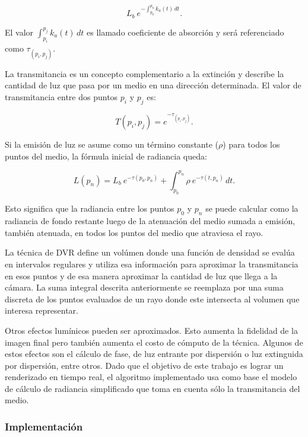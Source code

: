 \documentclass[oneside,a4paper,spanish,links]{amca}
\begin{document}
\begin{equation} \label{eq:radiance_absorption}  
    L_b \ \displaystyle e^{-\int_{p_0}^{p_n} k_a(t) \, dt}.
\end{equation}

El valor $\int_{p_i}^{p_j} k_a(t) \, dt$ es llamado coeficiente de
absorción y será referenciado como $\tau_{(p_i, p_j)}$.

La transmitancia es un concepto complementario a la extinción y
describe la cantidad de luz que pasa por un medio en una dirección
determinada. El valor de transmitancia entre dos puntos $p_i$ y $p_j$
es:

\begin{equation} \label{eq:general_radiance}  
  T(p_i,p_j) = e^{-\tau_{(p_i, p_j)}}.
\end{equation}

Si la emisión de luz se asume como un término constante ($\rho$) para
todos los puntos del medio, la fórmula inicial de radiancia queda:

\begin{equation} \label{eq:ray_radiance}  
  L(p_n) = L_b \ e^{-\tau(p_0, p_n)} + \int_{p_0}^{p_n} \rho \ e^{-\tau(t,p_n)} \, dt.
\end{equation}

Esto significa que la radiancia entre los puntos $p_0$ y
$p_n$ se puede calcular como la radiancia de fondo restante luego de
la atenuación del medio sumada a emisión, también atenuada, en todos
los puntos del medio que atraviesa el rayo.

La técnica de DVR define un volúmen donde una función de densidad se
evalúa en intervalos regulares y utiliza esa información para
aproximar la transmitancia en esos puntos y de esa manera aproximar la
cantidad de luz que llega a la cámara. La suma integral descrita
anteriormente se reemplaza por una suma discreta de los puntos
evaluados de un rayo donde este intersecta al volumen que interesa
representar. 

Otros efectos lumínicos pueden ser aproximados. Esto aumenta la
fidelidad de la imagen final pero también aumenta el costo de cómputo
de la técnica. Algunos de estos efectos son el cálculo de fase, de
luz entrante por dispersión o luz extinguida por dispersión, entre
otros. Dado que el objetivo de este trabajo es lograr un renderizado
en tiempo real, el algoritmo implementado usa como base el modelo de
cálculo de radiancia simplificado que toma en cuenta sólo la
transmitancia del medio.

\subsubsection{Implementación}
\end{document}
